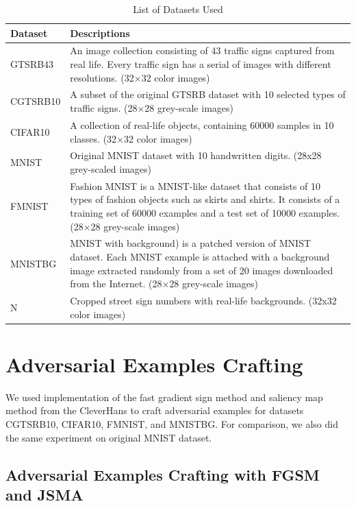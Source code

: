 \documentclass{article}
\begin{document}
\begin{table}[htb]
    \centering
    \begin{tabular}{ | C{0.15\textwidth} | C{0.83\textwidth} | }
    \toprule
    Dataset & Descriptions \\
    \midrule
    GTSRB43 & An image collection consisting of 43 traffic signs captured from real life. Every traffic sign has a serial of images with different resolutions. (32$\times$32 color images) \\ \midrule
    CGTSRB10 & A subset of the original GTSRB\cite{gtsrb} dataset with 10 selected types of traffic signs. (28$\times$28 grey-scale images) \\ \midrule
    CIFAR10 & A collection of real-life objects\cite{cifar10}, containing 60000 samples in 10 classes. (32$\times$32 color images) \\ \midrule
    MNIST & Original MNIST\cite{mnist} dataset with 10 handwritten digits. (28x28 grey-scaled images) \\ \midrule
    FMNIST & Fashion MNIST\cite{fmnist} is a MNIST-like dataset that consists of 10 types of fashion objects such as skirts and shirts. It consists of a training set of 60000 examples and a test set of 10000 examples. (28$\times$28 grey-scale images) \\ \midrule
    MNISTBG & MNIST with background)\cite{mnistbg} is a patched version of MNIST dataset. Each MNIST example is attached with a background image extracted randomly from a set of 20 images downloaded from the Internet. (28$\times$28 grey-scale images) \\ \midrule
    N & Cropped street sign numbers with real-life backgrounds\cite{svhn}. (32x32 color images) \\
    \bottomrule
    \end{tabular}
    \caption{\label{tab:datasetused} List of Datasets Used}
\end{table}

\section{Adversarial Examples Crafting}

We used implementation of the fast gradient sign method and saliency map method from the CleverHans\cite{cleverhans} to craft
adversarial examples for datasets CGTSRB10, CIFAR10, FMNIST, and MNISTBG.
For comparison, we also did the same experiment on original MNIST dataset.


\subsection{Adversarial Examples Crafting with FGSM and JSMA}
\end{document}
